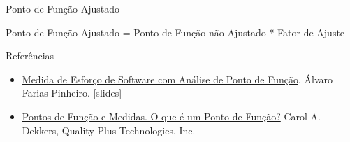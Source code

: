 \begin{frame}{Ponto de Função Ajustado}
  
  \begin{center}
    Ponto de Função Ajustado = Ponto de Função não Ajustado * Fator de Ajuste
  \end{center}
\end{frame}

\begin{frame}{Referências}
  \begin{itemize}
  \item
    \href{http://www.slideshare.net/alvarofpinheiro/medida-de-esforo-de-software-com-anlise-de-ponto-de-funo}{Medida
      de Esforço de Software com Análise de Ponto de Função}.  Álvaro
    Farias Pinheiro. [slides]
  \item
    \href{http://www.bfpug.com.br/Artigos/Dekkers-PontosDeFuncaoEMedidas.htm}{Pontos
      de Função e Medidas. O que é um Ponto de Função?} Carol
    A. Dekkers, Quality Plus Technologies, Inc.
  \end{itemize}
  
\end{frame}